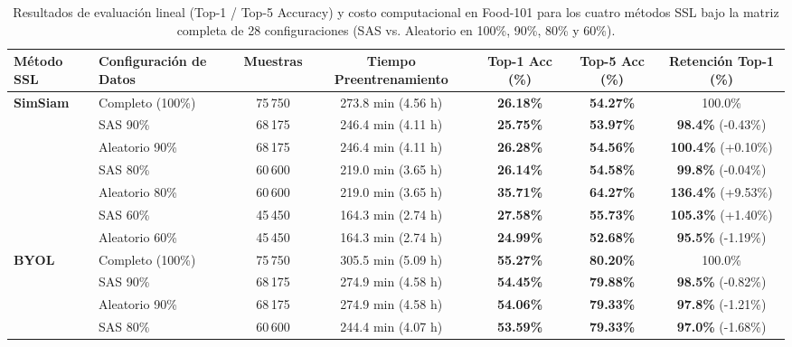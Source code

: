 \begin{table}[t]
\centering
\caption{Resultados de evaluación lineal (Top-1 / Top-5 Accuracy) y costo computacional en Food-101 para los cuatro métodos SSL bajo la matriz completa de 28 configuraciones (SAS vs. Aleatorio en 100\%, 90\%, 80\% y 60\%).}
\label{tab:results_matrix}
\begin{tabular}{llccccc}
\toprule
\textbf{Método SSL} & \textbf{Configuración de Datos} & \textbf{Muestras} & \textbf{Tiempo Preentrenamiento} & \textbf{Top-1 Acc (\%)} & \textbf{Top-5 Acc (\%)} & \textbf{Retención Top-1 (\%)} \\
\midrule
\textbf{SimSiam} & Completo (100\%)  & 75\,750 & 273.8 min (4.56 h)     & \textbf{26.18\%} & \textbf{54.27\%} & 100.0\% \\
                  & SAS 90\%          & 68\,175 & 246.4 min (4.11 h)     & \textbf{25.75\%} & \textbf{53.97\%} & \textbf{98.4\%} (-0.43\%) \\
                  & Aleatorio 90\%    & 68\,175 & 246.4 min (4.11 h)     & \textbf{26.28\%} & \textbf{54.56\%} & \textbf{100.4\%} (+0.10\%) \\
                  & SAS 80\%          & 60\,600 & 219.0 min (3.65 h)     & \textbf{26.14\%} & \textbf{54.58\%} & \textbf{99.8\%} (-0.04\%) \\
                  & Aleatorio 80\%    & 60\,600 & 219.0 min (3.65 h)     & \textbf{35.71\%} & \textbf{64.27\%} & \textbf{136.4\%} (+9.53\%) \\
                  & SAS 60\%          & 45\,450 & 164.3 min (2.74 h)     & \textbf{27.58\%} & \textbf{55.73\%} & \textbf{105.3\%} (+1.40\%) \\
                  & Aleatorio 60\%    & 45\,450 & 164.3 min (2.74 h)     & \textbf{24.99\%} & \textbf{52.68\%} & \textbf{95.5\%} (-1.19\%) \\
\midrule
\textbf{BYOL}     & Completo (100\%)  & 75\,750 & 305.5 min (5.09 h)     & \textbf{55.27\%} & \textbf{80.20\%} & 100.0\% \\
                  & SAS 90\%          & 68\,175 & 274.9 min (4.58 h)     & \textbf{54.45\%} & \textbf{79.88\%} & \textbf{98.5\%} (-0.82\%) \\
                  & Aleatorio 90\%    & 68\,175 & 274.9 min (4.58 h)     & \textbf{54.06\%} & \textbf{79.33\%} & \textbf{97.8\%} (-1.21\%) \\
                  & SAS 80\%          & 60\,600 & 244.4 min (4.07 h)     & \textbf{53.59\%} & \textbf{79.33\%} & \textbf{97.0\%} (-1.68\%) \\

\end{tabular}
\end{table}
